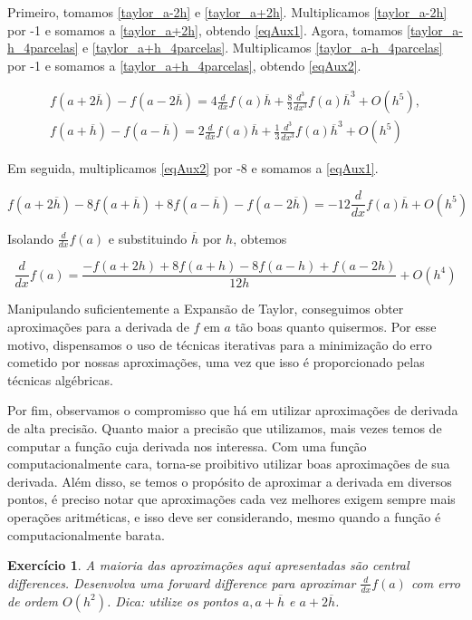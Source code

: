 \documentclass[]{article}
\newtheorem{exercicio}{Exercício}
\numberwithin{equation}{section}
\begin{document}
Primeiro, tomamos \eqref{taylor_a-2h} e \eqref{taylor_a+2h}. Multiplicamos \eqref{taylor_a-2h} por -1 e somamos a \eqref{taylor_a+2h}, obtendo \eqref{eqAux1}. Agora, tomamos \eqref{taylor_a-h_4parcelas} e \eqref{taylor_a+h_4parcelas}. Multiplicamos \eqref{taylor_a-h_4parcelas} por -1 e somamos a \eqref{taylor_a+h_4parcelas}, obtendo \eqref{eqAux2}.

\begin{align}
f(a + 2\overline{h}) - f(a - 2\overline{h}) = 4\frac{d}{dx} f(a) \overline{h} + \frac{8}{3} \frac{d^3}{dx^3} f(a) \overline{h}^3 + O(h^5), \label{eqAux1} \\
f(a + \overline{h}) - f(a - \overline{h}) = 2\frac{d}{dx} f(a) \overline{h} + \frac{1}{3} \frac{d^3}{dx^3} f(a) \overline{h}^3 + O(h^5) \label{eqAux2}
\end{align}

Em seguida, multiplicamos \eqref{eqAux2} por -8 e somamos a \eqref{eqAux1}.

$$
f(a + 2\overline{h}) - 8f(a + \overline{h}) + 8f(a - \overline{h}) - f(a - 2\overline{h}) = -12\frac{d}{dx} f(a) \overline{h} + O(h^5)
$$

Isolando $\frac{d}{dx} f(a)$ e substituindo $\overline{h}$ por $h$, obtemos

$$
\frac{d}{dx} f(a) = \frac{-f(a + 2h) + 8f(a + h) - 8f(a - h) + f(a - 2h)}{12h} + O(h^4)
$$

Manipulando suficientemente a Expansão de Taylor, conseguimos obter aproximações para a derivada de $f$ em $a$ tão boas quanto quisermos. Por esse motivo, dispensamos o uso de técnicas iterativas para a minimização do erro cometido por nossas aproximações, uma vez que isso é proporcionado pelas técnicas algébricas.

Por fim, observamos o compromisso que há em utilizar aproximações de derivada de alta precisão. Quanto maior a precisão que utilizamos, mais vezes temos de computar a função cuja derivada nos interessa. Com uma função computacionalmente cara, torna-se proibitivo utilizar boas aproximações de sua derivada. Além disso, se temos o propósito de aproximar a derivada em diversos pontos, é preciso notar que aproximações cada vez melhores exigem sempre mais operações aritméticas, e isso deve ser considerando, mesmo quando a função é computacionalmente barata.

\begin{exercicio}
	A maioria das aproximações aqui apresentadas são central differences. Desenvolva uma forward difference para aproximar $\frac{d}{dx} f(a)$ com erro de ordem $O(h^2)$. Dica: utilize os pontos $a, a + \overline{h}$ e $a + 2\overline{h}$.
\end{exercicio}
\end{document}

